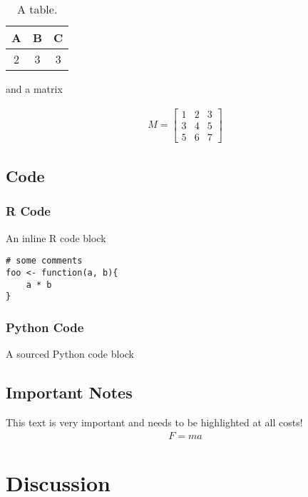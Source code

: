 \documentclass[11pt,a4paper]{article}
\begin{document}
\begin{table}[!htb]
\centering
\begin{tabular}{| c | c | c |}
\hline
A & B & C \\\hline
2 & 3 & 3 \\\hline
\end{tabular}
\caption{%
A table.
}
\label{tab:data}
\end{table}

and a matrix

\begin{align}
M =
\begin{bmatrix}
1 & 2 & 3 \\
3 & 4 & 5 \\
5 & 6 & 7
\end{bmatrix}
\end{align}

\subsection{Code}

\subsubsection{R Code}

An inline R code block

\begin{verbatim}
# some comments
foo <- function(a, b){
    a * b
}
\end{verbatim}

\subsubsection{Python Code}

A sourced Python code block



\subsection{Important Notes}

\begin{important}
This text is very important and needs to be highlighted
at all costs!
\begin{align}
F = ma
\end{align}
\end{important}

\clearpage

\section{Discussion}
\end{document}
